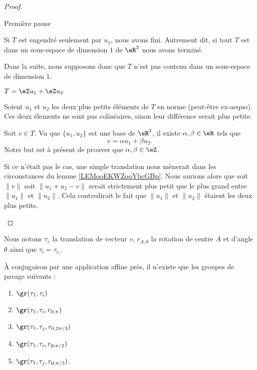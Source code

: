 \begin{proof}
\begin{subproof}
        \item[Première pause]

            Si \( T\) est engendré seulement par \( u_1\), nous avons fini. Autrement dit, si tout \( T\) est dans un sous-espace de dimension \( 1\) de \( \eR^2\) nous avons terminé.

            Dans la suite, nous supposons donc que \( T\) n'est pas contenu dans un sous-espace de dimension \( 1\).

        \item[\( T=\eZ u_1 + \eZ u_2\)]

            Soient \( u_1\) et \( u_2\) les deux plus petits éléments de \( T\) en norme (peut-être ex-aequo). Ces deux élements ne sont pas colinéaires, sinon leur différence serait plus petite.

            Soit \( v\in T\). Vu que \( \{ u_1,u_2 \}\) est une base de \( \eR^2\), il existe \( \alpha,\beta\in \eR\) tels que
            \begin{equation}
                v=\alpha u_1+\beta u_2.
            \end{equation}
            Notre but est à présent de prouver que \( \alpha,\beta\in \eZ\).

            Si ce n'était pas le cas, une simple translation nous mènerait dans les circonstances du lemme \ref{LEMooEKWZooYbcGBp}. Nous aurions alors que soit \( \| v \|\) soit \(\| u_1+u_2-v \|\) serait strictement plus petit que le plus grand entre \( \| u_1 \|\) et \( \| u_2 \|\). Cela contredirait le fait que \( \| u_1 \|\) et \( \| u_2 \|\) étaient les deux plus petits.
    \end{subproof}
\end{proof}

\begin{theorem}
    Nous notons \( \tau_v\) la translation de vecteur \( v\), \( r_{A,\theta}\) la rotation de centre \( A\) et d'angle \( \theta\) ainsi que \( \tau_i=\tau_{e_i}\).

    À conjugaison par une application affine près, il n'existe que les groupes de pavage suivants :
    \begin{enumerate}
        \item
            \( \gr(\tau_1,\tau_i)\)
        \item
            \( \gr(\tau_1,\tau_i,r_{0,\pi})\)
        \item
            \( \gr(\tau_1,\tau_j,r_{0,2\pi/3})\)
        \item
            \( \gr(\tau_1,\tau_i,r_{0;\pi/2})\)
        \item
            \( \gr(\tau_1,\tau_j,r_{0;\pi/3})\).
    \end{enumerate}
\end{theorem}

